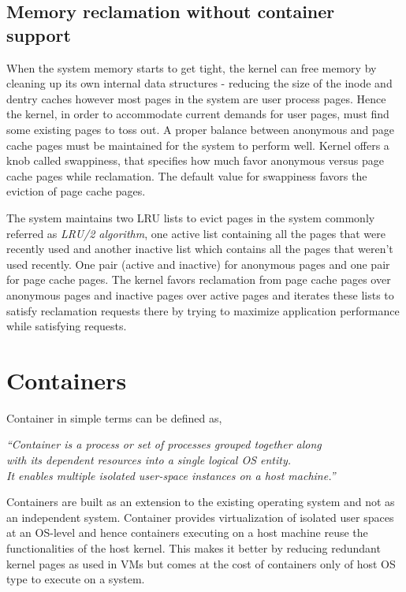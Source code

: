     \subsection{Memory reclamation without container support}
      When the system memory starts to get tight, the kernel can free memory by cleaning up its own internal data structures - reducing 
the size of the inode and dentry caches however most pages in the system are user process pages. Hence the kernel, in order to accommodate 
current demands for user pages, must find some existing pages to toss out. A proper balance between anonymous and page cache pages must be 
maintained for the system to perform well. Kernel offers a knob called swappiness, that specifies how much favor anonymous versus page 
cache pages while reclamation. The default value for swappiness favors the eviction of page cache pages. 
      
      The system maintains two LRU lists to evict pages in the system commonly referred as \textit{LRU/2 algorithm}, one active list 
      containing all the pages that were recently used and another inactive list which contains all the pages that weren't used recently. 
      One pair (active and inactive) for anonymous pages and one pair for page cache pages. The kernel favors reclamation from page cache 
      pages over anonymous pages and inactive pages over active pages and iterates these lists to satisfy reclamation requests there by 
      trying to maximize application performance while satisfying requests.


  \section{Containers}
    
        Container in simple terms can be defined as, 
  
    \begin{center}
      \textit{``Container is a process or set of processes grouped together along \\ with its dependent resources into a single logical OS 
entity. \\It enables multiple isolated user-space instances on a host machine.''} 
    \end{center}
    
    Containers \cite{manual} are built as an extension to the existing operating system and not as an independent system. Container 
provides virtualization of isolated user spaces at an OS-level and hence containers executing on a host machine reuse the functionalities of 
the host kernel. This makes it better by reducing redundant kernel pages as used in VMs but comes at the cost of containers only of host OS 
type to execute on a system.

